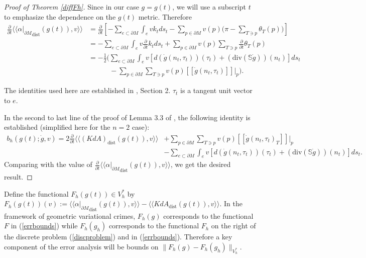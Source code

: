 \documentclass[11pt]{article}
\newcommand{\pdiff}[2]{\frac{\partial #1}{\partial #2}}
\newcommand{\iprod}[1]{\langle #1 \rangle}
\begin{document}
\begin{proof}[Proof of Theorem \ref{diffFh}]
Since in our case $g = g(t)$, we will use a subscript $t$ to emphasize the dependence on the $g(t)$ metric.  Therefore
\begin{align*}
\pdiff{}{t} \iprod{\iprod{{\alpha|_{\partial M}}_\mathrm{dist}(g(t)),v}} &= \pdiff{}{t}\left[-\sum_{e \subset \partial M} \int_e v k_tds_t - \sum_{p \in \partial M}v(p)\Bigg(\pi - \sum_{T \ni p} \theta_T(p)\Bigg)\right] \\
&= - \sum_{e \subset \partial M} \int_e v\pdiff{}{t} k_tds_t + \sum_{p \in \partial M} v(p)\sum_{T \ni p} \pdiff{}{t}\theta_T(p) \\
&= - \frac{1}{2}\Bigg(\sum_{e \subset \partial M}\int_ev[d(\dot{g}(n_t,\tau_t))(\tau_t) + (\mathrm{div}(\mathbb{S}\dot g))(n_t)]ds_t \\
&\quad\quad\quad- \sum_{p \in \partial M}\sum_{T \ni p} v(p)[\![\dot{g}(n_t,\tau_t)]\!]|_p \Bigg).
\end{align*}

The identities used here are established in \cite{GaNe22}, Section 2. $\tau_t$ is a tangent unit vector to $e$.

In the second to last line of the proof of Lemma 3.3 of \cite{GaNe22}, the following identity is established (simplified here for the $n = 2$ case):
\begin{align*}
b_h(g(t);\dot g, v) = 2\pdiff{}{t}\iprod{\iprod{(KdA)_\mathrm{dist}(g(t)),v}}  &+ \sum_{p \in \partial M} \sum_{T \ni p}v(p)[\![\dot{g}(n_t,\tau_t)_T]\!]|_p\\
&- \sum_{e \subset \partial M} \int_e v[d(\dot{g}(n_t,\tau_t))(\tau_t) + (\mathrm{div}(\mathbb{S}\dot{g}))(n_t)]ds_t.
\end{align*}
Comparing with the value of $\pdiff{}{t}\iprod{\iprod{{\alpha|_{\partial M}}_\mathrm{dist}(g(t)),v}}$, we get the desired result. 
\end{proof}
Define the functional $F_h(g(t)) \in V_h^*$ by $F_h(g(t))(v) := \iprod{\iprod{{\alpha|_{\partial M}}_\mathrm{dist}(g(t)),v}} - \iprod{\iprod{KdA_{\mathrm{dist}}(g(t)),v}}$. In the framework of geometric variational crimes, $F_h(g)$ corresponds to the functional $F$ in  (\ref{errbounds}) while $F_h(g_h)$ corresponds to the functional $F_h$ on the right of the discrete problem (\ref{discproblem}) and in (\ref{errbounds}). Therefore a key component of the error analysis will be bounds on $\|F_h(g) - F_h(g_h)\|_{V_h^*}$.
\end{document}
